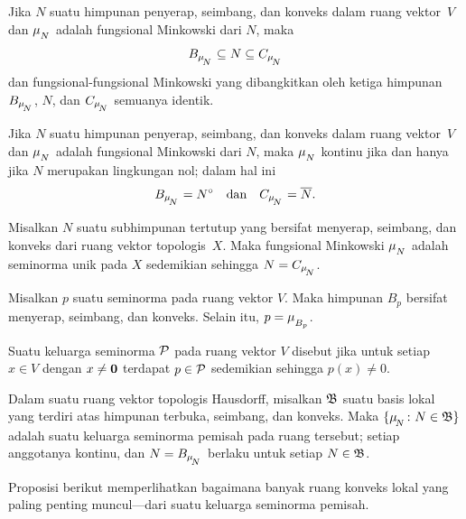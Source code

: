 \begin{prop} Jika $N$ suatu himpunan penyerap, seimbang, dan konveks dalam ruang vektor~$V$ dan $\mu_{{}_{\scriptstyle{N}}}$ adalah fungsional Minkowski dari $N$, maka
     \[ B_{\mu_{{}_{\scriptstyle{\!N}}}} \subseteq N \subseteq C_{\mu_{{}_{\scriptstyle{\!N}}}} \]
dan fungsional-fungsional Minkowski yang dibangkitkan oleh ketiga himpunan $B_{\mu_{{}_{\scriptstyle{\!N}}}}$, $N$, dan $C_{\mu_{{}_{\scriptstyle{\!N}}}}$ semuanya identik.
\end{prop}

\begin{prop} Jika $N$ suatu himpunan penyerap, seimbang, dan konveks dalam ruang vektor~$V$ dan $\mu_{{}_{\scriptstyle{N}}}$ adalah fungsional Minkowski dari $N$, maka
$\mu_{{}_{\scriptstyle{N}}}$ kontinu jika dan hanya jika $N$ merupakan lingkungan nol; dalam hal ini
  \[ B_{\mu_{{}_{\scriptstyle{\!N}}}} = {N}^{\circ} \quad \text{dan} \quad  C_{\mu_{{}_{\scriptstyle{\!N}}}} = \overline{N}. \]
\end{prop}

\begin{cor} Misalkan $N$ suatu subhimpunan tertutup yang bersifat menyerap, seimbang, dan konveks dari ruang vektor topologis~$X$. Maka fungsional Minkowski
$\mu_{{}_{\scriptstyle{N}}}$ adalah seminorma unik pada $X$ sedemikian sehingga $N = C_{\mu_{{}_{\scriptstyle{\!N}}}}$.
\end{cor}

\begin{prop} Misalkan $p$ suatu seminorma pada ruang vektor $V$. Maka himpunan $B_p$ bersifat menyerap, seimbang, dan konveks. Selain itu, $p = \mu_{{}_{\scriptstyle{B_p}}}$.
\end{prop}

\begin{defn} Suatu keluarga seminorma $\mathcal{P}$ pada ruang vektor $V$ disebut
 jika untuk setiap $x \in V$ dengan $x \ne \mathbf{0}$ terdapat $p \in \mathcal{P}$ sedemikian sehingga $p(x) \ne 0$.
\end{defn}

\begin{prop} Dalam suatu ruang vektor topologis Hausdorff, misalkan $\mathfrak{B}$ suatu basis lokal yang terdiri atas himpunan terbuka, seimbang, dan konveks. Maka
$\{\mu_{{}_{\scriptstyle{\!N}}}\colon N \in \mathfrak{B}\}$ adalah suatu keluarga seminorma pemisah pada ruang tersebut; setiap anggotanya kontinu, dan
$N = B_{\mu_{{}_{\scriptstyle{\!N}}}}$ berlaku untuk setiap $N \in \mathfrak{B}$.
\end{prop}

Proposisi berikut memperlihatkan bagaimana banyak ruang konveks lokal yang paling penting muncul---dari suatu keluarga
seminorma pemisah.

